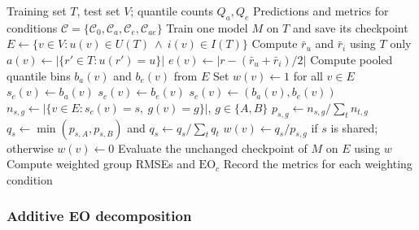 \documentclass[11pt]{article}
\begin{document}
\begin{algorithm}[H]
\caption{Test-set weighting and fixed-checkpoint evaluation}
\label{alg:test-set-weighting}
\begin{algorithmic}[1]
\Require Training set $T$, test set $V$; quantile counts $Q_a,Q_e$
\Ensure Predictions and metrics for conditions
       $\mathcal{C}=\{\mathcal C_0,\mathcal C_a,\mathcal C_e,\mathcal C_{ae}\}$
\State Train one model $M$ on $T$ and save its checkpoint
    \label{alg:test-train}
\State $E\gets\{v\in V:u(v)\in U(T)\ \land\ i(v)\in I(T)\}$
    \label{alg:test-eligible}
\State Compute $\bar r_u$ and $\bar r_i$ using $T$ only
    \label{alg:test-means}
    \State $a(v)\gets|\{r'\in T:u(r')=u\}|$
    \State $e(v)\gets\left|r-(\bar r_u+\bar r_i)/2\right|$
\EndFor
\State Compute pooled quantile bins $b_a(v)$ and $b_e(v)$ from $E$
      \label{alg:test-bins}
\label{alg:test-conditions}
        \State Set $w(v)\gets1$ for all $v\in E$
    \Else
            \State $s_c(v)\gets b_a(v)$
            \State $s_c(v)\gets b_e(v)$
        \Else
            \State $s_c(v)\gets(b_a(v),b_e(v))$
        \EndIf
                 \State $n_{s,g}\gets|\{v\in E:s_c(v)=s,\ g(v)=g\}|$,
                     $g\in\{A,B\}$
                     \label{alg:test-counts}
        \EndFor
        \State $p_{s,g}\gets n_{s,g}/\sum_t n_{t,g}$
                             \label{alg:test-proportions}
        \State $q_s\gets\min(p_{s,A},p_{s,B})$ and
               $q_s\gets q_s/\sum_tq_t$
                             \label{alg:test-target}
             \State $w(v)\gets q_s/p_{s,g}$ if $s$ is shared; otherwise
                 $w(v)\gets0$
                                 \label{alg:test-weights}
         \EndFor
    \EndIf
        \State Evaluate the unchanged checkpoint of $M$ on $E$ using $w$
                        \label{alg:test-evaluate}
        \State Compute weighted group RMSEs and $\mathrm{EO}_c$
\EndFor
\State Record the metrics for each weighting condition
            \label{alg:test-aggregate}
\end{algorithmic}
\end{algorithm}



\subsubsection{Additive EO decomposition}
\label{sec:eo-decomposition}
\end{document}
